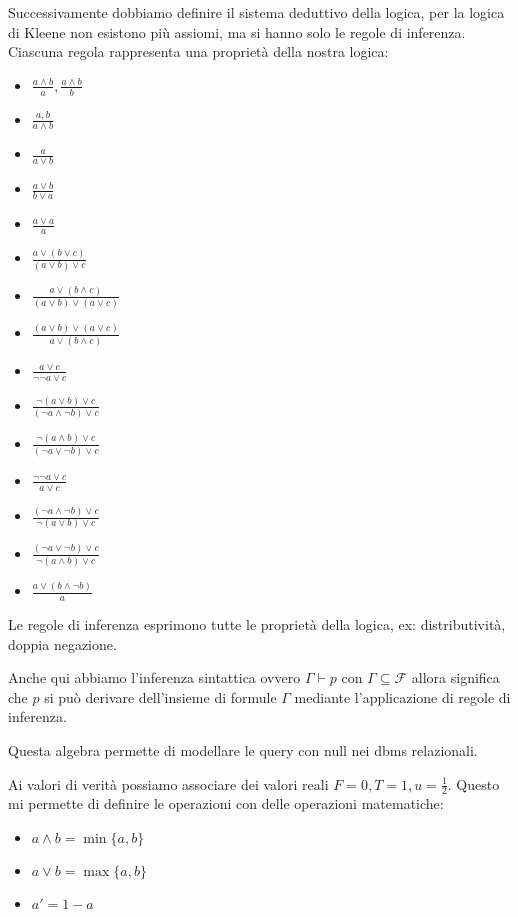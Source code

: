 Successivamente dobbiamo definire il sistema deduttivo della logica, per la logica 
di Kleene non esistono più assiomi, ma si hanno solo le regole di inferenza.
Ciascuna regola rappresenta una proprietà della nostra logica:
\begin{itemize}
    \item $\frac{a\land b}{a}, \frac{a\land b}{b}$
    \item $\frac{a, b}{a\land b}$
    \item $\frac{a}{a\lor b}$
    \item $\frac{a\lor b}{b\lor a}$
    \item $\frac{a\lor a}{ a}$
    \item $\frac{a\lor (b\lor c)}{ (a\lor b)\lor c}$
    \item $\frac{a\lor (b\land c)}{ (a\lor b) \lor (a\lor c)}$
    \item $\frac{ (a\lor b) \lor (a\lor c)}{a\lor (b\land c)}$
    \item $\frac{ a\lor c}{\lnot \lnot a\lor c}$
    \item $\frac{ \lnot(a\lor b)\lor c}{(\lnot a\land \lnot b)\lor c}$
    \item $\frac{ \lnot(a\land b)\lor c}{(\lnot a\lor \lnot b)\lor c}$
    \item $\frac{\lnot \lnot a\lor c}{ a\lor c}$
    \item $\frac{(\lnot a\land \lnot b)\lor c}{ \lnot(a\lor b)\lor c}$
    \item $\frac{(\lnot a\lor \lnot b)\lor c}{ \lnot(a\land b)\lor c}$
    \item $\frac{a\lor (b\land \lnot b)}{ a}$
\end{itemize}
Le regole di inferenza esprimono tutte le proprietà della logica,  ex: distributività, doppia negazione.

Anche qui abbiamo l'inferenza sintattica ovvero $\Gamma \vdash p$ con $\Gamma \subseteq \mathcal{F}$
allora significa che $p$ si può derivare dell'insieme di formule $\Gamma$ mediante 
l'applicazione di regole di inferenza.

Questa algebra permette di modellare le query con null nei dbms relazionali.

Ai valori di verità possiamo associare dei valori reali $F=0, T=1,u=\frac{1}{2}$.
Questo mi permette di definire le operazioni con delle operazioni matematiche:
\begin{itemize}
    \item $a\land b = \min \{a,b\}$
    \item $a\lor b = \max \{a,b\}$
    \item $a' = 1-a$
\end{itemize}

